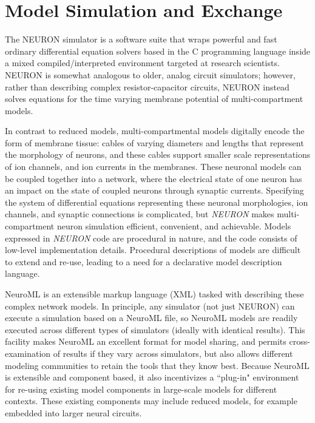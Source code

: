 \section{Model Simulation and Exchange}

The NEURON \citep{carnevale2006neuron} simulator is a software suite that wraps powerful and fast ordinary differential equation solvers based in the C programming language inside a mixed compiled/interpreted environment targeted at research scientists. NEURON is somewhat analogous to older, analog circuit simulators;
however, rather than describing complex resistor-capacitor circuits, NEURON instead solves equations for the time varying membrane potential of multi-compartment models.

In contrast to reduced models, multi-compartmental models digitally encode the form of membrane tissue: cables of varying diameters and lengths that represent the morphology of neurons, and these cables support smaller scale representations of ion channels, and ion currents in the membranes.
These neuronal models can be coupled together into a network, where the electrical state of one neuron has an impact on the state of coupled neurons through synaptic currents.
Specifying the system of differential equations representing these neuronal morphologies, ion channels, and synaptic connections is complicated, but \emph{NEURON} makes multi-compartment neuron simulation efficient, convenient, and achievable.
Models expressed in \emph{NEURON} code are procedural in nature, and the code consists of low-level implementation details.
Procedural descriptions of models are difficult to extend and re-use, leading to a need for a declarative model description language.

NeuroML \citep{gleeson2010neuroml} is an extensible markup language (XML) tasked with describing these complex network models.
In principle, any simulator (not just NEURON) can execute a simulation based on a NeuroML file, so NeuroML models are readily executed across different types of simulators (ideally with identical results).
This facility makes NeuroML an excellent format for model sharing, and permits cross-examination of results if they vary across simulators, but also allows different modeling communities to retain the tools that they know best.
Because NeuroML is extensible and component based, it also incentivizes a ``plug-in" environment for re-using existing model components in large-scale models for different contexts.
These existing components may include reduced models, for example embedded into larger neural circuits. 


